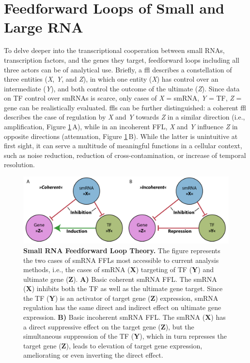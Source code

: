 \section{Feedforward Loops of Small and Large RNA} \label{sec:stroke:ffl}
To delve deeper into the transcriptional cooperation between small RNAs, transcription factors, and the genes they target, feedforward loops including all three actors can be of analytical use. Briefly, a \acf{ffl} describes a constellation of three entities (\emph{X}, \emph{Y}, and \emph{Z}), in which one entity (\emph{X}) has control over an intermediate (\emph{Y}), and both control the outcome of the ultimate (\emph{Z}).\cite{Reeves2019} Since data on TF control over smRNAs is scarce, only cases of \emph{X} = smRNA, \emph{Y} = TF, \emph{Z} = gene can be realistically evaluated. \Acp{ffl} can be further distinguished: a coherent \ac{ffl} describes the case of regulation by \emph{X} and \emph{Y} towards \emph{Z} in a similar direction (i.e., amplification, Figure \ref{fig:ffl-theory}\,A), while in an incoherent FFL, \emph{X} and \emph{Y} influence \emph{Z} in opposite directions (attenuation, Figure \ref{fig:ffl-theory}\,B). While the latter is unintuitive at first sight, it can serve a multitude of meaningful functions in a cellular context, such as noise reduction, reduction of cross-contamination, or increase of temporal resolution.\cite{Lai2016}

\begin{figure}[hb]
\includegraphics[width=\textwidth]{figures/ffl-theory}
\caption[Small RNA Feedforward Loop Theory.]{\textbf{Small RNA Feedforward Loop Theory.} The figure represents the two cases of smRNA FFLs most accessible to current analysis methods, i.e., the cases of smRNA (\textbf{X}) targeting of TF (\textbf{Y}) and ultimate gene (\textbf{Z}).  \textbf{A)} Basic coherent smRNA FFL. The smRNA (\textbf{X}) inhibits both the TF as well as the ultimate gene target. Since the TF (\textbf{Y}) is an activator of target gene (\textbf{Z}) expression, smRNA regulation has the same direct and indirect effect on ultimate gene expression. \textbf{B)} Basic incoherent smRNA FFL. The smRNA (\textbf{X}) has a direct suppressive effect on the target gene (\textbf{Z}), but the simultaneous suppression of the TF (\textbf{Y}), which in turn represses the target gene (\textbf{Z}), leads to elevation of target gene expression, ameliorating or even inverting the direct effect.
\label{fig:ffl-theory}}
\end{figure}

